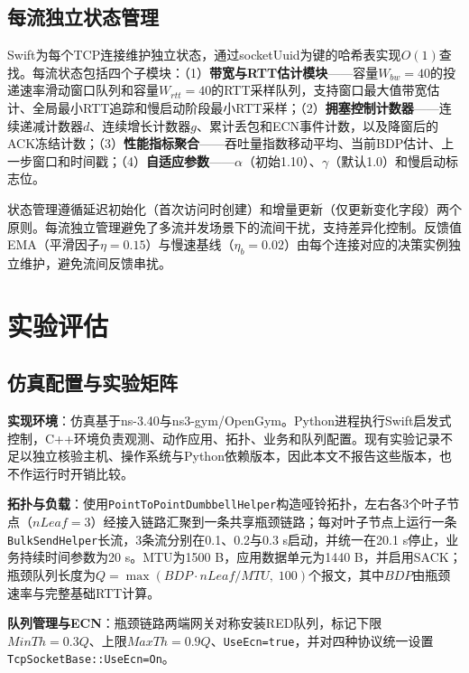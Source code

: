 \documentclass[10pt,twocolumn]{article}
\begin{document}
\subsection{每流独立状态管理}

Swift为每个TCP连接维护独立状态，通过socketUuid为键的哈希表实现$O(1)$查找。每流状态包括四个子模块：（1）\textbf{带宽与RTT估计模块}——容量$W_{bw}=40$的投递速率滑动窗口队列和容量$W_{rtt}=40$的RTT采样队列，支持窗口最大值带宽估计、全局最小RTT追踪和慢启动阶段最小RTT采样；（2）\textbf{拥塞控制计数器}——连续递减计数器$d$、连续增长计数器$g$、累计丢包和ECN事件计数，以及降窗后的ACK冻结计数；（3）\textbf{性能指标聚合}——吞吐量指数移动平均、当前BDP估计、上一步窗口和时间戳；（4）\textbf{自适应参数}——$\alpha$（初始1.10）、$\gamma$（默认1.0）和慢启动标志位。

状态管理遵循延迟初始化（首次访问时创建）和增量更新（仅更新变化字段）两个原则。每流独立管理避免了多流并发场景下的流间干扰，支持差异化控制。反馈值EMA（平滑因子$\eta=0.15$）与慢速基线（$\eta_b=0.02$）由每个连接对应的决策实例独立维护，避免流间反馈串扰。


\section{实验评估}

\subsection{仿真配置与实验矩阵}
\label{subsec:setup}

\textbf{实现环境}：仿真基于ns-3.40\cite{ns3}与ns3-gym/OpenGym\cite{opengym}。Python进程执行Swift启发式控制，C++环境负责观测、动作应用、拓扑、业务和队列配置。现有实验记录不足以独立核验主机、操作系统与Python依赖版本，因此本文不报告这些版本，也不作运行时开销比较。

\textbf{拓扑与负载}：使用\texttt{PointToPointDumbbellHelper}构造哑铃拓扑，左右各3个叶子节点（$nLeaf=3$）经接入链路汇聚到一条共享瓶颈链路；每对叶子节点上运行一条\texttt{BulkSendHelper}长流，3条流分别在0.1、0.2与0.3 s启动，并统一在20.1 s停止，业务持续时间参数为20 s。MTU为1500 B，应用数据单元为1440 B，并启用SACK；瓶颈队列长度为$Q=\max(BDP \cdot nLeaf / MTU, \; 100)$个报文，其中$BDP$由瓶颈速率与完整基础RTT计算。

\textbf{队列管理与ECN}：瓶颈链路两端网关对称安装RED队列，标记下限$MinTh = 0.3Q$、上限$MaxTh = 0.9Q$、\texttt{UseEcn=true}，并对四种协议统一设置\texttt{TcpSocketBase::UseEcn=On}。
\end{document}
